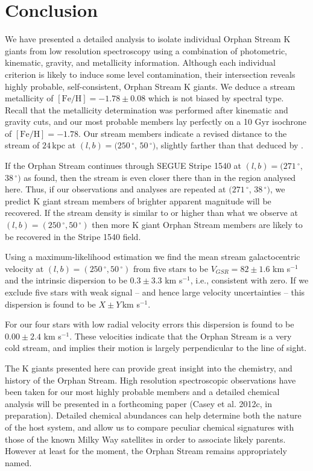 \documentclass{emulateapj}
\begin{document}
\section{Conclusion}
\label{sec:conclusions}

We have presented a detailed analysis to isolate individual Orphan Stream K giants from low resolution spectroscopy using a combination of photometric, kinematic, gravity, and metallicity information. Although each individual criterion is likely to induce some level contamination, their intersection reveals highly probable, self-consistent, Orphan Stream K giants.  We deduce a stream metallicity of $[\mbox{Fe/H}] = -1.78 \pm 0.08$ which is not biased by spectral type. Recall that the metallicity determination was performed after kinematic and gravity cuts, and our most probable members lay perfectly on a 10 Gyr isochrone of $[\mbox{Fe/H}] = -1.78$. Our stream members indicate a revised distance to the stream of $24$\,kpc at $(l, b) = (250\,^\circ$, $50\,^\circ)$, slightly farther than that deduced by \citet{Newberg;et-al_2010}.

If the Orphan Stream continues through SEGUE Stripe 1540 at $(l, b) = (271\,^\circ$, $38\,^\circ)$ as \citet{Newberg;et-al_2010} found, then the stream is even closer there than in the region analysed here. Thus, if our observations and analyses are repeated at $(271\,^\circ$, $38\,^\circ)$, we predict K giant stream members of brighter apparent magnitude will be recovered. If the stream density is similar to or higher than what we observe at $(l, b) = (250\,^\circ, 50\,^\circ)$ then more K giant Orphan Stream members are likely to be recovered in the Stripe 1540 field.

Using a maximum-likelihood estimation we find the mean stream galactocentric velocity at $(l, b) = (250\,^\circ, 50\,^\circ)$ from five stars to be $V_{GSR} = 82 \pm 1.6$ km s$^{-1}$ and the intrinsic dispersion to be $0.3 \pm 3.3$ km s$^{-1}$, i.e., consistent with zero. If we exclude five stars with weak signal \--- and hence large velocity uncertainties \--- this dispersion is found to be $X \pm Y$\,km s$^{-1}$.

For our four stars with low radial velocity errors this dispersion is found to be $0.00 \pm 2.4$ km s$^{-1}$. These velocities indicate that the Orphan Stream is a very cold stream, and implies their motion is largely perpendicular to the line of sight.

The K giants presented here can provide great insight into the chemistry, and history of the Orphan Stream. High resolution spectroscopic observations have been taken for our most highly probable members and a detailed chemical analysis will be presented in a forthcoming paper (Casey et al. 2012c, in preparation). Detailed chemical abundances can help determine both the nature of the host system, and allow us to compare peculiar chemical signatures with those of the known Milky Way satellites in order to associate likely parents. However at least for the moment, the Orphan Stream remains appropriately named.
\end{document}
